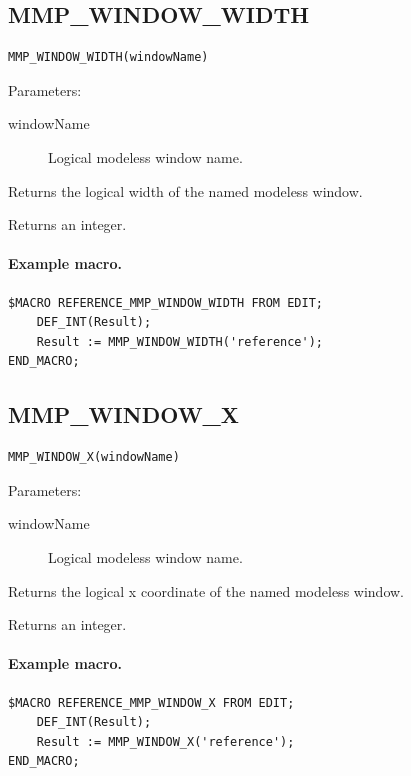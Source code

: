 \documentclass[a4paper,10pt,twoside,openany]{book}
\newenvironment{mrmacextension}{\begin{changebar}}{\end{changebar}}
\begin{document}
\begin{mrmacextension}
\label{prim:intrinsic-mmp-window-width}
\subsection*{MMP\_WINDOW\_WIDTH}
\begin{verbatim}
MMP_WINDOW_WIDTH(windowName)
\end{verbatim}
Parameters:
\begin{description}
\item[windowName] Logical modeless window name.
\end{description}

Returns the logical width of the named modeless window.

Returns an integer.

\paragraph{Example macro.}
\begin{verbatim}
$MACRO REFERENCE_MMP_WINDOW_WIDTH FROM EDIT;
    DEF_INT(Result);
    Result := MMP_WINDOW_WIDTH('reference');
END_MACRO;
\end{verbatim}
\end{mrmacextension}

\begin{mrmacextension}
\label{prim:intrinsic-mmp-window-x}
\subsection*{MMP\_WINDOW\_X}
\begin{verbatim}
MMP_WINDOW_X(windowName)
\end{verbatim}
Parameters:
\begin{description}
\item[windowName] Logical modeless window name.
\end{description}

Returns the logical x coordinate of the named modeless window.

Returns an integer.

\paragraph{Example macro.}
\begin{verbatim}
$MACRO REFERENCE_MMP_WINDOW_X FROM EDIT;
    DEF_INT(Result);
    Result := MMP_WINDOW_X('reference');
END_MACRO;
\end{verbatim}
\end{mrmacextension}
\end{document}
